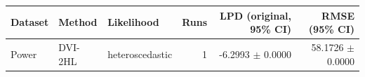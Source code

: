 \begin{tabular}{lllrrr}
\toprule
Dataset & Method & Likelihood & Runs & LPD (original, 95\% CI) & RMSE (95\% CI) \\
\midrule
Power & DVI-2HL & heteroscedastic & 1 & -6.2993 $\pm$ 0.0000 & 58.1726 $\pm$ 0.0000 \\
\bottomrule
\end{tabular}
